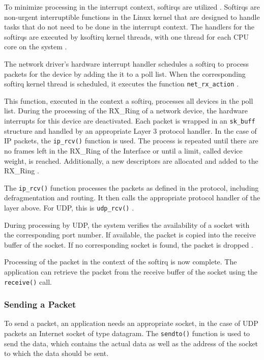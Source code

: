 To minimize processing in the interrupt context, softirqs are utilized \cite{lins03}. Softirqs are non-urgent interruptible functions in the Linux kernel that are designed to handle tasks that do not need to be done in the interrupt context. The handlers for the softirqs are executed by ksoftirq kernel threads, with one thread for each CPU core on the system \cite{like02}.

The network driver's hardware interrupt handler schedules a softirq to process packets for the device by adding the it to a poll list. When the corresponding softirq kernel thread is scheduled, it executes the function \texttt{net\_rx\_action} \cite{lins03}.

This function, executed in the context a softirq, processes all devices in the poll list. During the processing of the RX\_Ring of a network device, the hardware interrupts for this device are deactivated. Each  packet is wrapped in an \texttt{sk\_buff} structure and handled by an appropriate Layer 3 protocol handler. In the case of IP packets, the \texttt{ip\_rcv()} function is used. The process is repeated until there are no frames left in the RX\_Ring of the Interface or until a limit, called device weight, is reached. Additionally, a new descriptors are allocated and added to the RX\_Ring \cite{lins03, lins13, lins14}.

The \texttt{ip\_rcv()} function processes the packets as defined in the protocol, including defragmentation and routing. It then calls the appropriate protocol handler of the layer above. For UDP, this is \texttt{udp\_rcv()} \cite{lins01}.

During processing by UDP, the system verifies the availability of a socket with the corresponding port number. If available, the packet is copied into the receive buffer of the socket. If no corresponding socket is found, the packet is dropped \cite{lins01}.

Processing of the packet in the context of the softirq is now complete. The application can retrieve the packet from the receive buffer of the socket using the \texttt{receive()} call.


\subsubsection{Sending a Packet}
To send a packet, an application needs an appropriate socket, in the case of UDP packets an Internet socket of type datagram. The \texttt{sendto()} function is used to send the data, which contains the actual data as well as the address of the socket to which the data should be sent.

